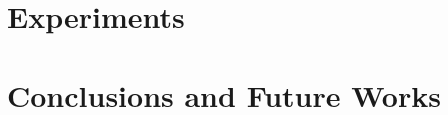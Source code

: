 \documentclass[a4paper,11pt]{report}
\begin{document}
\chapter{Experiments}\label{chapter:Experiments}


\chapter{Conclusions and Future Works}\label{chapter:Conclusions and Future Works}


%

%
%

%



\clearpage
{}


%
\end{document}
